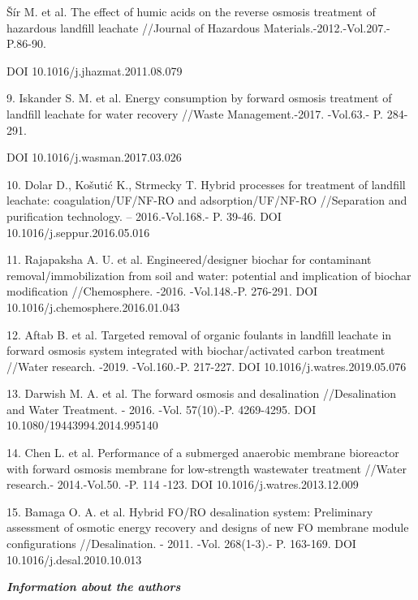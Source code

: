 \begin{noparindent}
Šír M. et al. The effect of humic acids on the reverse osmosis treatment
of hazardous landfill leachate //Journal of Hazardous
Materials.-2012.-Vol.207.- P.86-90.

DOI 10.1016/j.jhazmat.2011.08.079

9. Iskander S. M. et al. Energy consumption by forward osmosis treatment
  of landfill leachate for water recovery //Waste Management.-2017.
  -Vol.63.- P. 284-291.

DOI 10.1016/j.wasman.2017.03.026

10.
  Dolar D., Košutić K., Strmecky T. Hybrid processes for treatment of
  landfill leachate: coagulation/UF/NF-RO and adsorption/UF/NF-RO
  //Separation and purification technology. -- 2016.-Vol.168.- P. 39-46.
  DOI 10.1016/j.seppur.2016.05.016

11.
  Rajapaksha A. U. et al. Engineered/designer biochar for contaminant
  removal/immobilization from soil and water: potential and implication
  of biochar modification //Chemosphere. -2016. -Vol.148.-P. 276-291.
  DOI 10.1016/j.chemosphere.2016.01.043

12.
  Aftab B. et al. Targeted removal of organic foulants in landfill
  leachate in forward osmosis system integrated with biochar/activated
  carbon treatment //Water research. -2019. -Vol.160.-P. 217-227. DOI
  10.1016/j.watres.2019.05.076

13.
  Darwish M. A. et al. The forward osmosis and desalination
  //Desalination and Water Treatment. - 2016. -Vol. 57(10).-P.
  4269-4295. DOI 10.1080/19443994.2014.995140

14.
  Chen L. et al. Performance of a submerged anaerobic membrane
  bioreactor with forward osmosis membrane for low-strength wastewater
  treatment //Water research.- 2014.-Vol.50. -P. 114 -123. DOI
  10.1016/j.watres.2013.12.009

15.
  Bamaga O. A. et al. Hybrid FO/RO desalination system: Preliminary
  assessment of osmotic energy recovery and designs of new FO membrane
  module configurations //Desalination. - 2011. -Vol. 268(1-3).- P.
  163-169. DOI 10.1016/j.desal.2010.10.013
\end{noparindent}

\emph{{\bfseries Information about the authors}}

